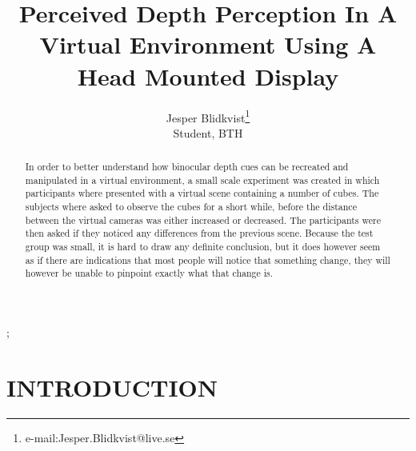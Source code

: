 \documentclass[tog]{acmsiggraph}
\title{Perceived Depth Perception In A Virtual Environment Using A Head Mounted Display}
\author{Jesper Blidkvist\thanks{e-mail:Jesper.Blidkvist@live.se}\\Student, BTH}
\begin{document}


\maketitle

\begin{abstract}
In order to better understand how binocular depth cues can be recreated and manipulated in a virtual environment, a small scale experiment was created in which participants where presented with a virtual scene containing a number of cubes. The subjects where asked to observe the cubes for a short while, before the distance between the virtual cameras was either increased or decreased. The participants were then asked if they noticed any differences from the previous scene. Because the test group was small, it is hard to draw any definite conclusion, but it does however seem as if there are indications that most people will notice that something change, they will however be unable to pinpoint exactly what that change is.  



\end{abstract}

\begin{CRcatlist}
  ;
\end{CRcatlist}

\keywordlist


\copyrightspace

\section{INTRODUCTION}
\end{document}
